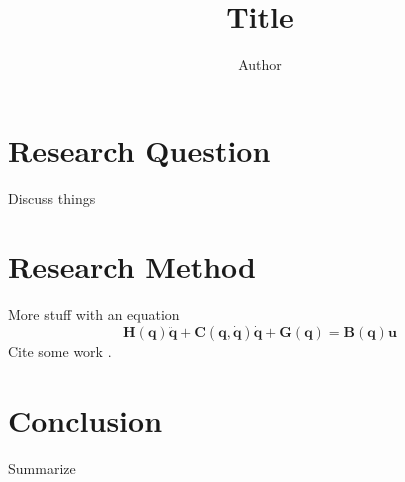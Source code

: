 \documentclass[11pt,reqno]{amsart} %
\title{Title }
\author{Author}
\date{} %
\begin{document}
\maketitle
\begin{multicols}{2}
\section{Research Question}
Discuss things
\section{Research Method}
More stuff with an equation
\begin{equation}
	\bm{H(q) \ddot{q} + C(q,\dot{q}) \dot{q} + G(q) = B(q) u}
	\label{eq:std_dyn}
\end{equation}
Cite some work \cite{marsden2001}.
\section{Conclusion}
Summarize

%


\end{multicols}
\end{document}

